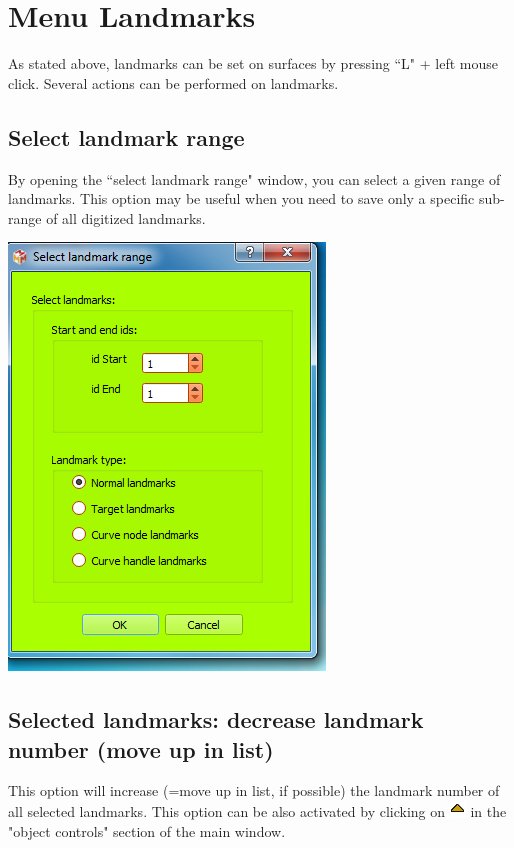 
\chapter{Menu Landmarks}\label{landmark_chapter}
\minitoc 


As stated above, landmarks can be set on surfaces by pressing ``L" + left mouse click. Several actions
can be performed on landmarks.


\section{Select landmark range}
\noindent
\begin{minipage}{0.5\textwidth}
By opening the ``select landmark range" window, you can
select a given range of landmarks. This option may be useful
when you need to save only a specific sub-range of all digitized landmarks.
\end{minipage}    
\begin{minipage}{0.5\textwidth}\centering
  \includegraphics[scale=0.5]{images/10/select_landmark_range.png}
 \end{minipage} 
\noindent


\section{Selected landmarks: decrease landmark number (move up in list)}
This option will increase (=move up in list, if possible) the landmark number of all selected landmarks. This option can be also activated by clicking on \includegraphics[scale=0.7]{images/06/objects/move_up.png} in the "object controls" section of the main window.
 
